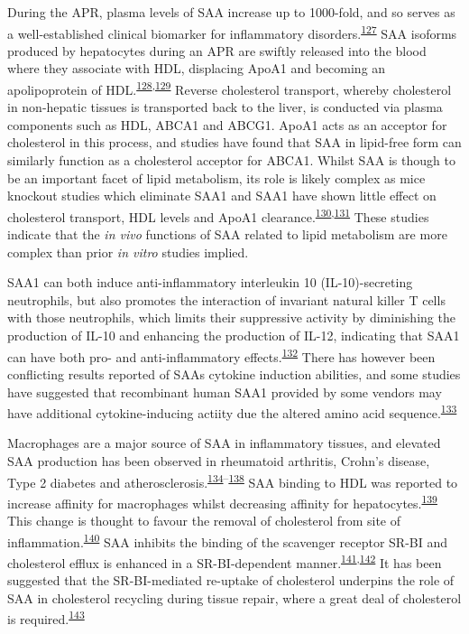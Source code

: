 \documentclass[
]{article}
\begin{document}
During the APR, plasma levels of SAA increase up to 1000-fold, and so serves as a well-established clinical biomarker for inflammatory disorders.\textsuperscript{\protect\hyperlink{ref-gabay_acute-phase_1999}{127}}
SAA isoforms produced by hepatocytes during an APR are swiftly released into the blood where they associate with HDL, displacing ApoA1 and becoming an apolipoprotein of HDL.\textsuperscript{\protect\hyperlink{ref-banka_serum_1995}{128},\protect\hyperlink{ref-benditt_amyloid_1977}{129}}
Reverse cholesterol transport, whereby cholesterol in non-hepatic tissues is transported back to the liver, is conducted via plasma components such as HDL, ABCA1 and ABCG1.
ApoA1 acts as an acceptor for cholesterol in this process, and studies have found that SAA in lipid-free form can similarly function as a cholesterol acceptor for ABCA1.
Whilst SAA is though to be an important facet of lipid metabolism, its role is likely complex as mice knockout studies which eliminate SAA1 and SAA1 have shown little effect on cholesterol transport, HDL levels and ApoA1 clearance.\textsuperscript{\protect\hyperlink{ref-de_beer_impact_2010}{130},\protect\hyperlink{ref-de_beer_atp_2011}{131}}
These studies indicate that the \emph{in vivo} functions of SAA related to lipid metabolism are more complex than prior \emph{in vitro} studies implied.

SAA1 can both induce anti-inflammatory interleukin 10 (IL-10)-secreting neutrophils, but also promotes the interaction of invariant natural killer T cells with those neutrophils, which limits their suppressive activity by diminishing the production of IL-10 and enhancing the production of IL-12, indicating that SAA1 can have both pro- and anti-inflammatory effects.\textsuperscript{\protect\hyperlink{ref-santo_invariant_2010}{132}}
There has however been conflicting results reported of SAAs cytokine induction abilities, and some studies have suggested that recombinant human SAA1 provided by some vendors may have additional cytokine-inducing actiity due the altered amino acid sequence.\textsuperscript{\protect\hyperlink{ref-kim_saa_2013}{133}}

Macrophages are a major source of SAA in inflammatory tissues, and elevated SAA production has been observed in rheumatoid arthritis, Crohn's disease, Type 2 diabetes and atherosclerosis.\textsuperscript{\protect\hyperlink{ref-marzi_acute-phase_2013}{134}--\protect\hyperlink{ref-meek_expression_1994}{138}}
SAA binding to HDL was reported to increase affinity for macrophages whilst decreasing affinity for hepatocytes.\textsuperscript{\protect\hyperlink{ref-kisilevsky_serum_1992}{139}}
This change is thought to favour the removal of cholesterol from site of inflammation.\textsuperscript{\protect\hyperlink{ref-kisilevsky_serum_1991}{140}}
SAA inhibits the binding of the scavenger receptor SR-BI and cholesterol efflux is enhanced in a SR-BI-dependent manner.\textsuperscript{\protect\hyperlink{ref-cai_serum_2005}{141},\protect\hyperlink{ref-van_der_westhuyzen_serum_2005}{142}}
It has been suggested that the SR-BI-mediated re-uptake of cholesterol underpins the role of SAA in cholesterol recycling during tissue repair, where a great deal of cholesterol is required.\textsuperscript{\protect\hyperlink{ref-kisilevsky_acute-phase_2012}{143}}
\end{document}
